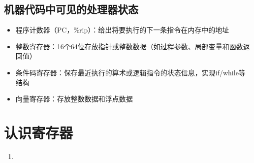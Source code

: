 \documentclass[twoside]{ctexart}
\begin{document}
    \subsection{机器代码中可见的处理器状态}
    \begin{itemize}
        \item 程序计数器（PC，\%rip）：给出将要执行的下一条指令在内存中的地址
        \item 整数寄存器：16个64位存放指针或整数数据（如过程参数、局部变量和函数返回值）
        \item 条件码寄存器：保存最近执行的算术或逻辑指令的状态信息，实现if/while等结构
        \item 向量寄存器：存放整数数据和浮点数据

    \end{itemize}
        
    \section{认识寄存器}
    \begin{enumerate}
        \item 
    \end{enumerate}
    
    
    
    
    
    
\end{document}
